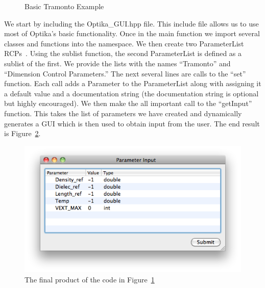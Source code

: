 \begin{figure}
\centering
{\footnotesize
{}
}
\caption{Basic Tramonto Example}
\label{basicTramonto}
\end{figure}
We start by including the Optika\_GUI.hpp file. This include file allows us to use most of Optika's basic functionality.
Once in the main function we import several classes and functions into the namespace. We then create two
ParameterList RCPs~\cite{RCP}. Using the sublist function, the second 
ParameterList is defined as a sublist of the first. We provide the lists with the names ``Tramonto'' and
``Dimension Control Parameters.'' The next several lines are calls to the ``set'' function. Each call
adds a Parameter to the ParameterList along with assigning it a default value and a documentation string (the 
documentation string is optional but highly encouraged). We then make
the all important call to the ``getInput'' function. This takes the list of parameters we have created and dynamically
generates a GUI which is then used to obtain input from the user. The end result is Figure~\ref{BasicTramontoScreenshot}.
\begin{figure}
\centering
\includegraphics[scale=0.5]{graphics/BasicTramontoScreenshot}
\caption{The final product of the code in Figure~\ref{basicTramonto}}
\label{BasicTramontoScreenshot}
\end{figure}

